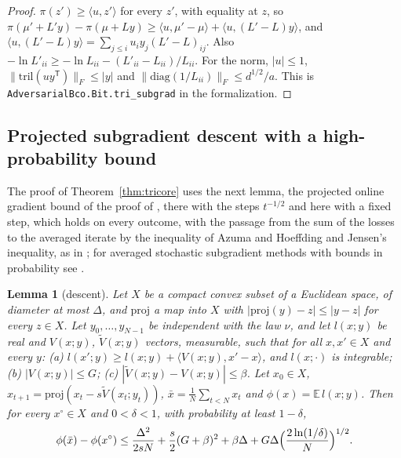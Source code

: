 \documentclass[11pt]{amsart}
\newtheorem{lemma}[theorem]{Lemma}
\theoremstyle{definition}
\numberwithin{equation}{section}
\newcommand{\E}{\mathbb{E}}
\newcommand{\ip}[1]{\langle #1\rangle}
\begin{document}
\begin{proof}
$\pi(z')\ge\ip{u,z'}$ for every $z'$, with equality at $z$, so $\pi(\mu'+L'y)-\pi(\mu+Ly)\ge\ip{u,\mu'-\mu}+\ip{u,(L'-L)y}$, and $\ip{u,(L'-L)y}=\sum_{j\le i}u_iy_j(L'-L)_{ij}$. Also $-\ln L'_{ii}\ge-\ln L_{ii}-(L'_{ii}-L_{ii})/L_{ii}$. For the norm, $|u|\le1$, $\|\mathrm{tril}(uy^{\mathsf T})\|_F\le|y|$ and $\|\mathrm{diag}(1/L_{ii})\|_F\le d^{1/2}/a$.
This is \texttt{AdversarialBco.Bit.tri\_subgrad} in the formalization.
\end{proof}

\subsection{Projected subgradient descent with a high-probability bound}

The proof of Theorem~\ref{thm:tricore} uses the next lemma, the projected online gradient bound of the proof of \cite[Theorem~1]{Zin03}, there with the steps $t^{-1/2}$ and here with a fixed step, which holds on every outcome, with the passage from the sum of the losses to the averaged iterate by the inequality of Azuma and Hoeffding and Jensen's inequality, as in \cite[Proposition~1 and Corollary~2]{CCG04}; for averaged stochastic subgradient methods with bounds in probability see \cite[Section~2.3]{NJLS09}.

\begin{lemma}[descent]\label{lem:hpsgd}
Let $X$ be a compact convex subset of a Euclidean space, of diameter at most $\Delta$, and $\mathrm{proj}$ a map into $X$ with $|\mathrm{proj}(y)-z|\le|y-z|$ for every $z\in X$. Let $y_0,\dots,y_{N-1}$ be independent with the law $\nu$, and let $l(x;y)$ be real and $V(x;y)$, $\tilde V(x;y)$ vectors, measurable, such that for all $x,x'\in X$ and every $y$: (a) $l(x';y)\ge l(x;y)+\ip{V(x;y),x'-x}$, and $l(x;\cdot)$ is integrable; (b) $|V(x;y)|\le G$; (c) $|\tilde V(x;y)-V(x;y)|\le\beta$. Let $x_0\in X$, $x_{t+1}=\mathrm{proj}(x_t-s\tilde V(x_t;y_t))$, $\bar x=\frac1N\sum_{t<N}x_t$ and $\phi(x)=\E\,l(x;y)$. Then for every $x^\circ\in X$ and $0<\delta<1$, with probability at least $1-\delta$,
\[
\phi(\bar x)-\phi(x^\circ)\le\frac{\Delta^2}{2sN}+\frac s2(G+\beta)^2+\beta\Delta+G\Delta\Bigl(\frac{2\ln(1/\delta)}N\Bigr)^{1/2}.
\]
\end{lemma}
\end{document}
